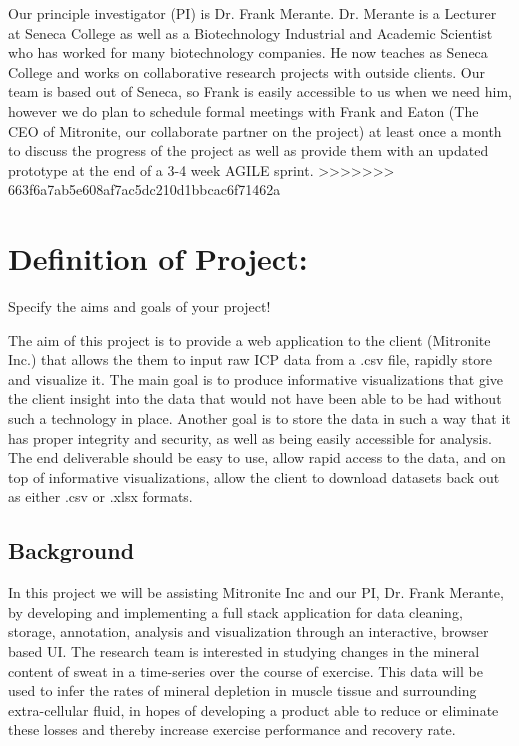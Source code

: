 \documentclass[10pt,twocolumn,letterpaper]{article}
\begin{document}
		Our principle investigator (PI) is Dr. Frank Merante.
		Dr. Merante is a Lecturer at Seneca College as well as a Biotechnology Industrial and Academic Scientist who has worked for many biotechnology companies.
		He now teaches as Seneca College and works on collaborative research projects with outside clients.
		Our team is based out of Seneca, so Frank is easily accessible to us when we need him, however we do plan to schedule formal meetings with Frank and Eaton (The CEO of
		Mitronite, our collaborate partner on the project) at least once a month to discuss the progress of the project as well as provide them with an updated prototype at the
		end of a 3-4 week AGILE sprint.
>>>>>>> 663f6a7ab5e608af7ac5dc210d1bbcac6f71462a
		
\section{Definition of Project:}

        Specify the aims and goals of your project!
		
		The aim of this project is to provide a web application to the client (Mitronite Inc.) that allows the them to input raw ICP data from a .csv file, rapidly store and
		visualize it.
		The main goal is to produce informative visualizations that give the client insight into the data that would not have been able to be had without such a technology in
		place.
		Another goal is to store the data in such a way that it has proper integrity and security, as well as being easily accessible for analysis.
		The end deliverable should be easy to use, allow rapid access to the data, and on top of informative visualizations, allow the client to download datasets back out as
		either .csv or .xlsx formats.
		
            \subsection{Background}

            In this project we will be assisting Mitronite Inc and our PI, Dr. Frank Merante, by developing and implementing a full stack application for data cleaning, storage,
	    annotation, analysis and visualization through an interactive, browser based UI.
	    The research team is interested in studying changes in the mineral content of sweat in a time-series over the course of exercise. This data will be used to infer the
	    rates of mineral depletion in muscle tissue and surrounding extra-cellular fluid, in hopes of developing a product able to reduce or eliminate these losses and
	    thereby increase exercise performance and recovery rate.
\end{document}
